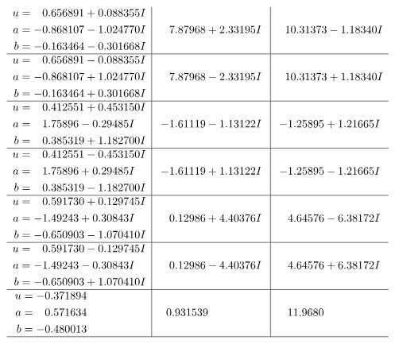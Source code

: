 \documentclass[1p]{elsarticle_modified}
\theoremstyle{definition}
\begin{document}
$$\begin{array}{c|c|c}
\begin{aligned}
u &= \phantom{-}0.656891 + 0.088355 I \\
a &= -0.868107 - 1.024770 I \\
b &= -0.163464 - 0.301668 I\end{aligned}
 & \phantom{-}7.87968 + 2.33195 I & \phantom{-}10.31373 - 1.18340 I \\ \hline\begin{aligned}
u &= \phantom{-}0.656891 - 0.088355 I \\
a &= -0.868107 + 1.024770 I \\
b &= -0.163464 + 0.301668 I\end{aligned}
 & \phantom{-}7.87968 - 2.33195 I & \phantom{-}10.31373 + 1.18340 I \\ \hline\begin{aligned}
u &= \phantom{-}0.412551 + 0.453150 I \\
a &= \phantom{-}1.75896 - 0.29485 I \\
b &= \phantom{-}0.385319 + 1.182700 I\end{aligned}
 & -1.61119 - 1.13122 I & -1.25895 + 1.21665 I \\ \hline\begin{aligned}
u &= \phantom{-}0.412551 - 0.453150 I \\
a &= \phantom{-}1.75896 + 0.29485 I \\
b &= \phantom{-}0.385319 - 1.182700 I\end{aligned}
 & -1.61119 + 1.13122 I & -1.25895 - 1.21665 I \\ \hline\begin{aligned}
u &= \phantom{-}0.591730 + 0.129745 I \\
a &= -1.49243 + 0.30843 I \\
b &= -0.650903 - 1.070410 I\end{aligned}
 & \phantom{-}0.12986 + 4.40376 I & \phantom{-}4.64576 - 6.38172 I \\ \hline\begin{aligned}
u &= \phantom{-}0.591730 - 0.129745 I \\
a &= -1.49243 - 0.30843 I \\
b &= -0.650903 + 1.070410 I\end{aligned}
 & \phantom{-}0.12986 - 4.40376 I & \phantom{-}4.64576 + 6.38172 I \\ \hline\begin{aligned}
u &= -0.371894\phantom{ +0.000000I} \\
a &= \phantom{-}0.571634\phantom{ +0.000000I} \\
b &= -0.480013\phantom{ +0.000000I}\end{aligned}
 & \phantom{-}0.931539\phantom{ +0.000000I} & \phantom{-}11.9680\phantom{ +0.000000I}\\
 \hline 
 \end{array}$$\newpage\newpage\renewcommand{\arraystretch}{1}
\end{document}

